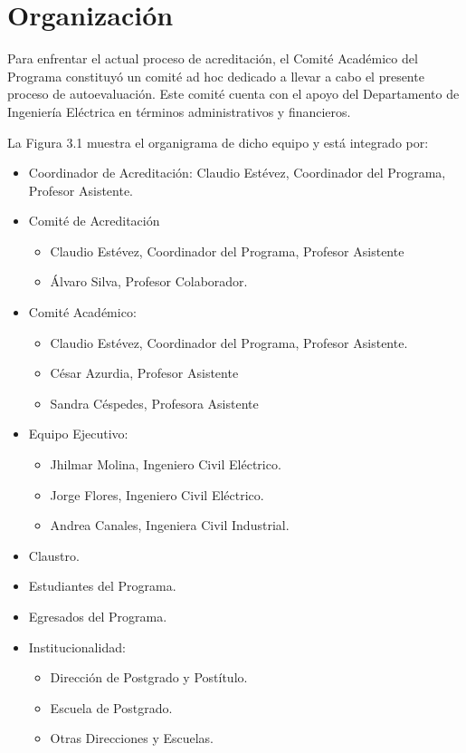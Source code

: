\section{Organización}

Para enfrentar el actual proceso de acreditación, el Comité Académico del Programa constituyó un
comité ad hoc dedicado a llevar a cabo el presente proceso de autoevaluación. Este comité cuenta
con el apoyo del Departamento de Ingeniería Eléctrica en términos administrativos y financieros.

La Figura 3.1 muestra el organigrama de dicho equipo y está integrado por:

\begin{itemize}
\item Coordinador de Acreditación: Claudio Estévez, Coordinador del Programa, Profesor Asistente.
\item Comité de Acreditación
\begin{itemize}
\item Claudio Estévez, Coordinador del Programa, Profesor Asistente
\item Álvaro Silva, Profesor Colaborador.
\end{itemize}
\item Comité Académico:
\begin{itemize}
\item Claudio Estévez, Coordinador del Programa, Profesor Asistente.
\item César Azurdia, Profesor Asistente
\item Sandra Céspedes, Profesora Asistente
\end{itemize}
\item Equipo Ejecutivo:
\begin{itemize}
\item Jhilmar Molina, Ingeniero Civil Eléctrico.
\item Jorge Flores, Ingeniero Civil Eléctrico.
\item Andrea Canales, Ingeniera Civil Industrial.
\end{itemize}
\item Claustro.
\item Estudiantes del Programa.
\item Egresados del Programa.
\item Institucionalidad:
\begin{itemize}
\item Dirección de Postgrado y Postítulo.
\item Escuela de Postgrado.
\item Otras Direcciones y Escuelas.
\end{itemize}
\end{itemize}

